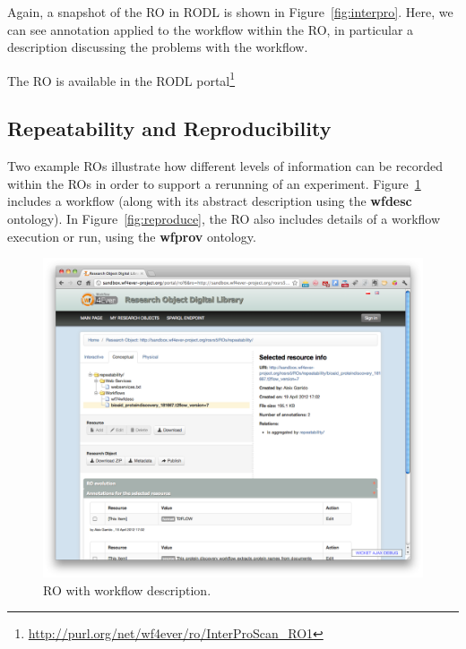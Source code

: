 Again, a snapshot of the RO in RODL is shown in
Figure~\ref{fig:interpro}. Here, we can see annotation applied to the
workflow within the RO, in particular a description discussing the
problems with the workflow. 

The RO is available in the RODL portal\footnote{\url{http://purl.org/net/wf4ever/ro/InterProScan_RO1}}

\subsection{Repeatability and Reproducibility}

Two example ROs illustrate how different levels of information can be
recorded within the ROs in order to support a rerunning of an
experiment. Figure~\ref{fig:repeat} includes a workflow (along with
its abstract description using the \textbf{wfdesc} ontology). In
Figure~\ref{fig:reproduce}, the RO also includes details of a workflow
execution or run, using the \textbf{wfprov} ontology.

\begin{figure}[h]
  \centering
  \includegraphics[width=\picwidth]{Figures/repeat}
 \caption{RO with workflow description.}
  \label{fig:repeat}
\end{figure}


